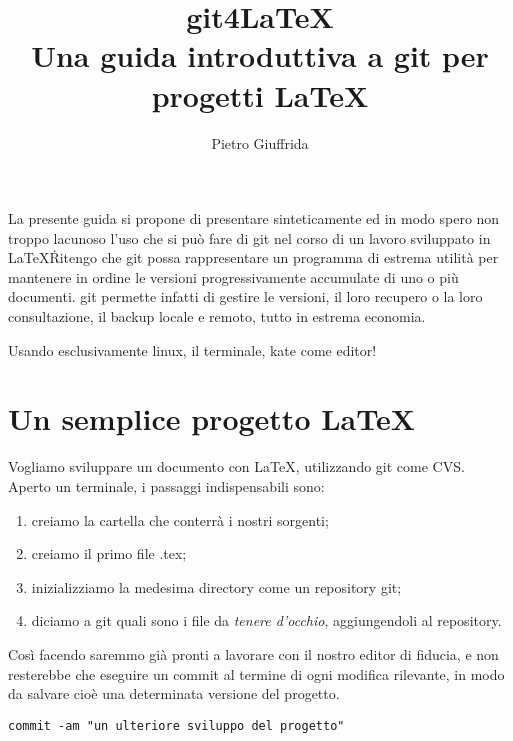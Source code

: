 \documentclass{article}
\begin{document}
\title{git4\LaTeX \\
  Una guida introduttiva a git per progetti \LaTeX}
\author{Pietro Giuffrida}
\maketitle

La presente guida si propone di presentare sinteticamente ed in modo spero non
troppo lacunoso l'uso che si può fare di git nel corso di un lavoro sviluppato
in \LaTeX\. Ritengo che git possa rappresentare un programma di estrema utilità
per mantenere in ordine le versioni progressivamente accumulate di uno o più
documenti. git permette infatti di gestire le versioni, il loro recupero o la
loro consultazione, il backup locale e remoto, tutto in estrema economia.

Usando esclusivamente linux, il terminale, kate come editor!


\section{Un semplice progetto \LaTeX}
Vogliamo sviluppare un documento con \LaTeX, utilizzando git come CVS.
Aperto un terminale, i passaggi indispensabili sono:
\begin{enumerate}
\item creiamo la cartella che conterrà i nostri sorgenti;
\item creiamo il primo file .tex;
\item inizializziamo la medesima directory come un repository git;
\item diciamo a git quali sono i file da \textit{tenere d'occhio},
aggiungendoli al repository.
\end{enumerate}

\begin{framed}

\end{framed}

Così facendo saremmo già pronti a lavorare con il nostro editor di fiducia, e
non resterebbe che eseguire un commit al termine di ogni modifica rilevante, in
modo da salvare cioè una determinata versione del progetto.

\begin{framed}
\begin{lstlisting}
commit -am "un ulteriore sviluppo del progetto"
\end{lstlisting}
\end{framed}
\end{document}
